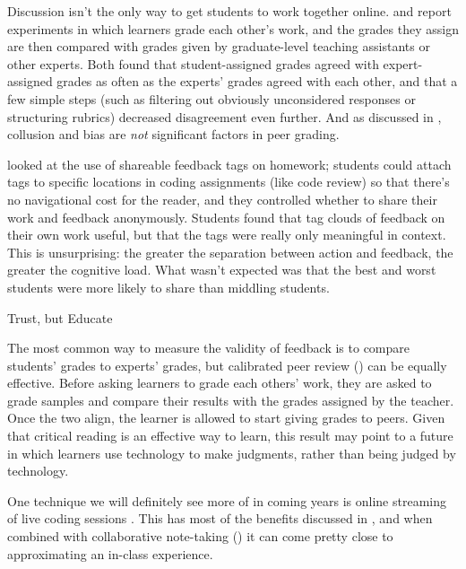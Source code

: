 Discussion isn't the only way to get students to work together online.
\cite{Pare2008} and \cite{Kulk2013} report experiments in which
learners grade each other's work, and the grades they assign are then
compared with grades given by graduate-level teaching assistants or
other experts. Both found that student-assigned grades agreed with
expert-assigned grades as often as the experts' grades agreed with
each other, and that a few simple steps (such as filtering out
obviously unconsidered responses or structuring rubrics) decreased
disagreement even further.  And as discussed in
, collusion and bias are \emph{not}
significant factors in peer grading.

\cite{Cumm2011} looked at the use of shareable feedback tags on
homework; students could attach tags to specific locations in coding
assignments (like code review) so that there's no navigational cost
for the reader, and they controlled whether to share their work and
feedback anonymously.  Students found that tag clouds of feedback on
their own work useful, but that the tags were really only meaningful
in context.  This is unsurprising: the greater the separation between
action and feedback, the greater the cognitive load.  What wasn't
expected was that the best and worst students were more likely to
share than middling students.

\begin{callout}{Trust, but Educate}

  The most common way to measure the validity of feedback is to
  compare students' grades to experts' grades, but calibrated peer
  review () can be equally effective.
  Before asking learners to grade each others' work, they are asked to
  grade samples and compare their results with the grades assigned by
  the teacher.  Once the two align, the learner is allowed to start
  giving grades to peers.  Given that critical reading is an effective
  way to learn, this result may point to a future in which learners
  use technology to make judgments, rather than being judged by
  technology.

\end{callout}

One technique we will definitely see more of in coming years is online
streaming of live coding sessions \cite{Haar2017}. This has most of
the benefits discussed in , and when
combined with collaborative note-taking
() it can come pretty close to
approximating an in-class experience.

